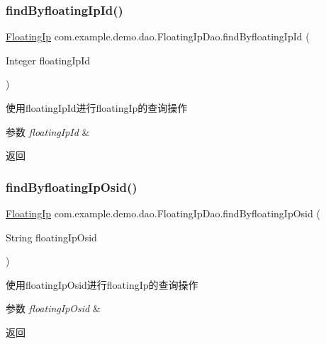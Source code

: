 \subsubsection{\texorpdfstring{find\+Byfloating\+Ip\+Id()}{findByfloatingIpId()}}
{\footnotesize\ttfamily \mbox{\hyperlink{classcom_1_1example_1_1demo_1_1modular_1_1_floating_ip}{Floating\+Ip}} com.\+example.\+demo.\+dao.\+Floating\+Ip\+Dao.\+find\+Byfloating\+Ip\+Id (\begin{DoxyParamCaption}\item[{Integer}]{floating\+Ip\+Id }\end{DoxyParamCaption})}

使用floating\+Ip\+Id进行floating\+Ip的查询操作 
\begin{DoxyParams}{参数}
{\em floating\+Ip\+Id} & \\
\hline
\end{DoxyParams}
\begin{DoxyReturn}{返回}

\end{DoxyReturn}
\mbox{\label{interfacecom_1_1example_1_1demo_1_1dao_1_1_floating_ip_dao_a7508361dd368d6f77f0097bd46dfa3fb}} 
\subsubsection{\texorpdfstring{find\+Byfloating\+Ip\+Osid()}{findByfloatingIpOsid()}}
{\footnotesize\ttfamily \mbox{\hyperlink{classcom_1_1example_1_1demo_1_1modular_1_1_floating_ip}{Floating\+Ip}} com.\+example.\+demo.\+dao.\+Floating\+Ip\+Dao.\+find\+Byfloating\+Ip\+Osid (\begin{DoxyParamCaption}\item[{String}]{floating\+Ip\+Osid }\end{DoxyParamCaption})}

使用floating\+Ip\+Osid进行floating\+Ip的查询操作 
\begin{DoxyParams}{参数}
{\em floating\+Ip\+Osid} & \\
\hline
\end{DoxyParams}
\begin{DoxyReturn}{返回}

\end{DoxyReturn}
\mbox{\label{interfacecom_1_1example_1_1demo_1_1dao_1_1_floating_ip_dao_a39f612808e5425d52f0dd47b2d134600}} 
